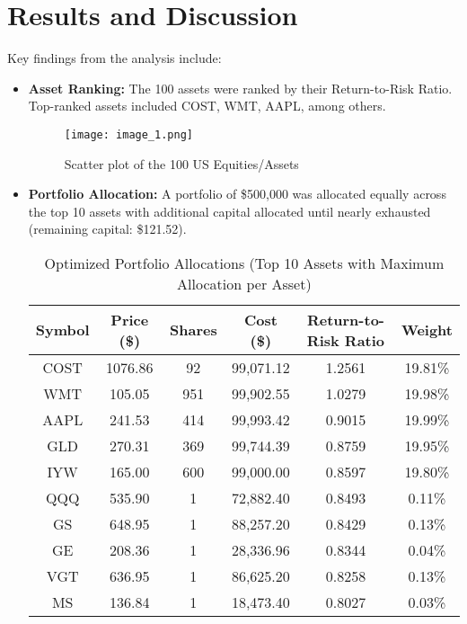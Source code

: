 \documentclass[11pt]{article}
\begin{document}
\section{Results and Discussion}
Key findings from the analysis include:
\begin{itemize}
    \item \textbf{Asset Ranking:} The 100 assets were ranked by their Return-to-Risk Ratio. Top-ranked assets included COST, WMT, AAPL, among others.
    \begin{figure}[H]
    \centering
    \texttt{[image: image\_1.png]}
    \caption{Scatter plot of the 100 US Equities/Assets }
    \label{fig:scatter plot}
\end{figure}

    \item \textbf{Portfolio Allocation:} A portfolio of \$500,000 was allocated equally across the top 10 assets with additional capital allocated until nearly exhausted (remaining capital: \$121.52).
    \begin{table}[H]
    \centering
    \caption{Optimized Portfolio Allocations (Top 10 Assets with Maximum Allocation per Asset)}
    \begin{tabular}{|c|c|c|c|c|c|}
        \hline
        \textbf{Symbol} & \textbf{Price (\$)} & \textbf{Shares} & \textbf{Cost (\$)} & \textbf{Return-to-Risk Ratio} & \textbf{Weight} \\ 
        \hline
        COST  & 1076.86  & 92  & 99,071.12  & 1.2561  & 19.81\%  \\
        WMT   & 105.05   & 951 & 99,902.55  & 1.0279  & 19.98\%   \\
        AAPL  & 241.53   & 414 & 99,993.42  & 0.9015  & 19.99\%   \\
        GLD   & 270.31   & 369 & 99,744.39  & 0.8759  & 19.95\%   \\
        IYW   & 165.00   & 600 & 99,000.00  & 0.8597  & 19.80\%   \\
        QQQ   & 535.90   & 1 & 72,882.40  & 0.8493  & 0.11\%  \\
        GS    & 648.95   & 1 & 88,257.20  & 0.8429  & 0.13\%  \\
        GE    & 208.36   & 1 & 28,336.96  & 0.8344  & 0.04\%   \\
        VGT   & 636.95   & 1 & 86,625.20  & 0.8258  & 0.13\%  \\
        MS    & 136.84   & 1 & 18,473.40  & 0.8027  & 0.03\%   \\
        \hline
    \end{tabular}
    \label{tab:optimized_portfolio}
\end{table}


\end{itemize}
\end{document}
